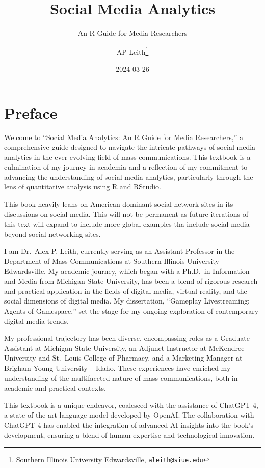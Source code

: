 \documentclass[
]{book}
\title{Social Media Analytics}
\subtitle{An R Guide for Media Researchers}
\author{AP Leith\footnote{Southern Illinois University Edwardsville, \href{mailto:aleith@siue.edu}{\nolinkurl{aleith@siue.edu}}}}
\date{2024-03-26}
\begin{document}
\maketitle

{
\setcounter{tocdepth}{1}
\tableofcontents
}
\hypertarget{preface}{%
\chapter*{Preface}\label{preface}}

Welcome to ``Social Media Analytics: An R Guide for Media Researchers,'' a comprehensive guide designed to navigate the intricate pathways of social media analytics in the ever-evolving field of mass communications. This textbook is a culmination of my journey in academia and a reflection of my commitment to advancing the understanding of social media analytics, particularly through the lens of quantitative analysis using R and RStudio.

This book heavily leans on American-dominant social network sites in its discussions on social media. This will not be permanent as future iterations of this text will expand to include more global examples tha include social media beyond social networking sites.

I am Dr.~Alex P. Leith, currently serving as an Assistant Professor in the Department of Mass Communications at Southern Illinois University Edwardsville. My academic journey, which began with a Ph.D.~in Information and Media from Michigan State University, has been a blend of rigorous research and practical application in the fields of digital media, virtual reality, and the social dimensions of digital media. My dissertation, ``Gameplay Livestreaming: Agents of Gamespace,'' set the stage for my ongoing exploration of contemporary digital media trends.

My professional trajectory has been diverse, encompassing roles as a Graduate Assistant at Michigan State University, an Adjunct Instructor at McKendree University and St.~Louis College of Pharmacy, and a Marketing Manager at Brigham Young University -- Idaho. These experiences have enriched my understanding of the multifaceted nature of mass communications, both in academic and practical contexts.

This textbook is a unique endeavor, coalesced with the assistance of ChatGPT 4, a state-of-the-art language model developed by OpenAI. The collaboration with ChatGPT 4 has enabled the integration of advanced AI insights into the book's development, ensuring a blend of human expertise and technological innovation.
\end{document}

